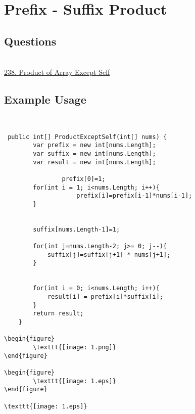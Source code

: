 \chapter{Prefix - Suffix Product}
\section{Questions}\\


\href{https://leetcode.com/problems/product-of-array-except-self/description/}{238. Product of Array Except Self}


\section{Example Usage}\\



\begin{lstlisting}
 public int[] ProductExceptSelf(int[] nums) {
        var prefix = new int[nums.Length];
        var suffix = new int[nums.Length];
        var result = new int[nums.Length];

				prefix[0]=1;
        for(int i = 1; i<nums.Length; i++){
					prefix[i]=prefix[i-1]*nums[i-1];
        }


        suffix[nums.Length-1]=1;

        for(int j=nums.Length-2; j>= 0; j--){
            suffix[j]=suffix[j+1] * nums[j+1];
        }


        for(int i = 0; i<nums.Length; i++){
            result[i] = prefix[i]*suffix[i];
        }
        return result;
    }
		
\begin{figure}
		\texttt{[image: 1.png]}
\end{figure}

\begin{figure}
		\texttt{[image: 1.eps]}
\end{figure}

\texttt{[image: 1.eps]}

\end{lstlisting}\\ \\